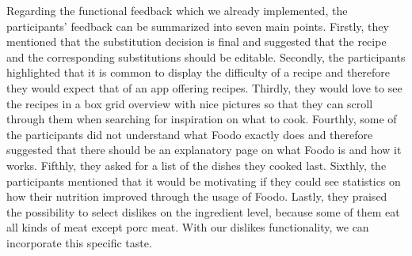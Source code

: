 Regarding the functional feedback which we already implemented, the participants' feedback can be summarized into seven main points. 
Firstly, they mentioned that the substitution decision is final and suggested that the recipe and the corresponding substitutions should be editable. 
Secondly, the participants highlighted that it is common to display the difficulty of a recipe and therefore they would expect that of an app offering recipes. 
Thirdly, they would love to see the recipes in a box grid overview with nice pictures so that they can scroll through them when searching for inspiration on what to cook. 
Fourthly, some of the participants did not understand what Foodo exactly does and therefore suggested that there should be an explanatory page on what Foodo is and how it works. 
Fifthly, they asked for a list of the dishes they cooked last. 
Sixthly, the participants mentioned that it would be motivating if they could see statistics on how their nutrition improved through the usage of Foodo.
Lastly, they praised the possibility to select dislikes on the ingredient level, because some of them eat all kinds of meat except porc meat. With our dislikes functionality, we can incorporate this specific taste.


